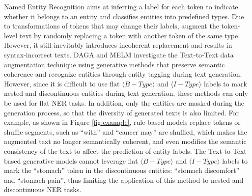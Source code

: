 Named Entity Recognition aims at inferring a label for each token to indicate whether it belongs to an entity and classifies entities into predefined types. Due to transformations of tokens that may change their labels, \citet{dai-adel-2020-analysis} augment the token-level text by randomly replacing a token with another token of the same type. However, it still inevitably introduces incoherent replacement and results in syntax-incorrect texts. DAGA \cite{ding-etal-2020-daga} and MELM \cite{zhou2022melm} investigate the Text-to-Text data augmentation technique using generative methods that preserve semantic coherence and recognize entities through entity tagging during text generation.
However, since it is difficult to use flat $\langle B-Type\rangle$ and $\langle I-Type\rangle$ labels to mark nested and discontinuous entities during text generation, these methods can only be used for flat NER tasks. In addition, only the entities are masked during the generation process, so that the diversity of generated texts is also limited. For example, as shown in Figure \ref{fig:example}, rule-based models replace tokens or shuffle segments, such as ``with'' and ``cancer may'' are shuffled, which makes the augmented text no longer semantically coherent, and even modifies the semantic consistency of the text to affect the prediction of entity labels. The Text-to-Text based generative models cannot leverage flat $\langle B-Type\rangle$ and $\langle I-Type\rangle$ labels to mark the ``stomach'' token in the discontinuous entities: ``stomach discomfort'' and ``stomach pain'', thus limiting the application of this method to nested and discontinuous NER tasks.

